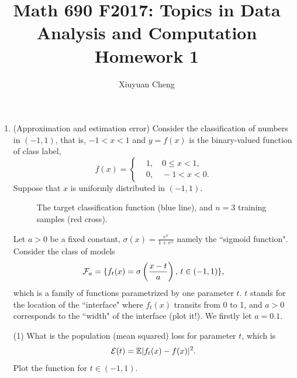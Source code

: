 \documentclass[english]{article}
\newcommand{\E}{\mathbb{E}}
\begin{document}
\title{Math 690 F2017: Topics in Data Analysis and Computation\\
Homework 1}

\author{Xiuyuan Cheng}

\date{}

\maketitle

\begin{enumerate}

\item
(Approximation and estimation error)
Consider the classification of numbers in $(-1,1)$, that is, 
$-1 <x  <1$ and $y=f(x)$ is the binary-valued function of class label, 
\[
f(x) = \begin{cases}
& 1,  \quad 0 \le  x < 1,\\
& 0,  \quad -1 <  x < 0.
\end{cases}
\]
Suppose that $x$ is uniformly distributed in $(-1,1)$. 

\begin{figure}[h]
\caption{
The target classification function (blue line), and $n=3$ training samples (red cross).
}
\label{fig:1}
\end{figure}



Let $a > 0$ be a fixed constant,  $\sigma(x)=\frac{e^x}{ 1+ e^x}$ namely the ``sigmoid function".
Consider the class of models
\[
{\cal F}_a = \{ f_t(x) = \sigma\left(\frac{x-t}{a}\right), \, t\in (-1,1) \},
\]
which is a family of functions parametrized by one parameter $t$. $t$ stands for the location of the ``interface" where $f_t(x)$ transits from 0 to 1, and $a>0$ corresponds to the ``width" of the interface (plot it!). We firstly let $a=0.1$.

(1) What is the population (mean squared) loss for parameter $t$, which is 
\[
{\cal E} (t ) = \E |f_t(x) - f(x) |^2.
\]
Plot the function for $t \in (-1,1)$.


\end{enumerate}
\end{document}

